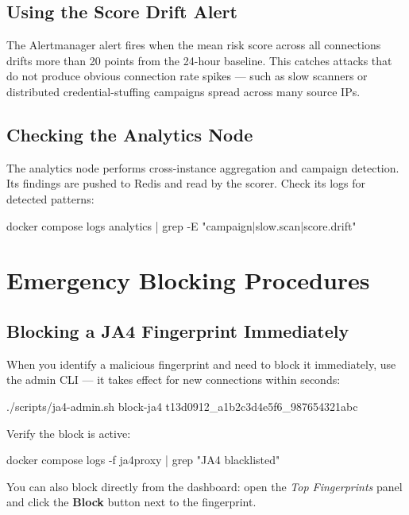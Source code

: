 \subsection{Using the Score Drift Alert}

The  Alertmanager alert fires when the mean risk score across all
connections drifts more than 20 points from the 24-hour baseline. This catches
attacks that do not produce obvious connection rate spikes — such as slow scanners
or distributed credential-stuffing campaigns spread across many source IPs.

\subsection{Checking the Analytics Node}

The analytics node performs cross-instance aggregation and campaign detection.
Its findings are pushed to Redis and read by the scorer. Check its logs for
detected patterns:

\begin{bashcode}
docker compose logs analytics | grep -E "campaign|slow.scan|score.drift"
\end{bashcode}

\section{Emergency Blocking Procedures}

\subsection{Blocking a JA4 Fingerprint Immediately}

When you identify a malicious fingerprint and need to block it immediately, use
the admin CLI — it takes effect for new connections within seconds:

\begin{bashcode}
./scripts/ja4-admin.sh block-ja4 t13d0912_a1b2c3d4e5f6_987654321abc
\end{bashcode}

Verify the block is active:
\begin{bashcode}
docker compose logs -f ja4proxy | grep "JA4 blacklisted"
\end{bashcode}

You can also block directly from the dashboard: open the \emph{Top Fingerprints}
panel and click the \textbf{Block} button next to the fingerprint.


